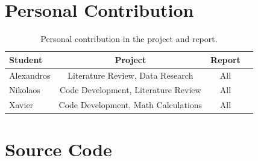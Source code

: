 \documentclass[12pt]{article}
\begin{document}
\begin{appendices}

\section{Personal Contribution} 

\begin{table}[hc]
		\begin{tabular}{|l|c|c|c|}
  			\hline
	  		\textbf{Student} & \textbf{Project} & \textbf{Report} \\
	  		\hline
  			Alexandros & Literature Review, Data Research & All \\ 
  			\hline
  			Nikolaos & Code Development, Literature Review & All \\
	  		\hline
  			Xavier & Code Development, Math Calculations & All \\
  			\hline
  		\end{tabular}
	\caption[A table]{Personal contribution in the project and report.}	
\end{table}


\section{Source Code} 

\end{appendices}
\end{document}
